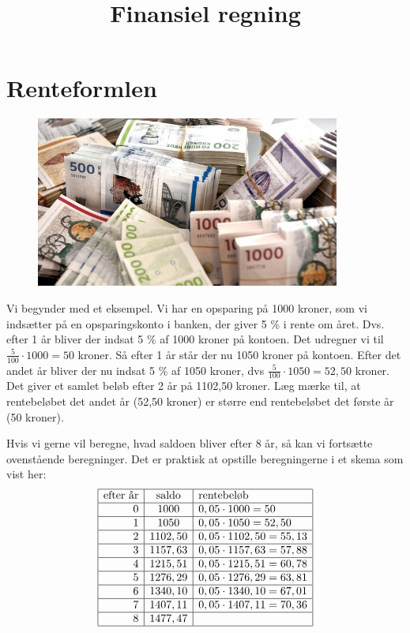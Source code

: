 \documentclass[12pt,oneside,a4paper]{article}
\title{Finansiel regning}
\date{\vspace{-5ex}}
\begin{document}
\maketitle


\section{Renteformlen}
\begin{figure}[ht]
    \centering
    \includegraphics[width=10cm]{penge}
\end{figure}

Vi begynder med et eksempel. Vi har en opsparing på 1000 kroner, som vi
indsætter på en opsparingskonto i banken, der giver 5 \% i rente om året. Dvs.
efter 1 år bliver der indsat 5 \% af 1000 kroner på kontoen. Det
udregner vi til $ \frac{5}{100} \cdot 1000 = 50 $ kroner. Så efter 1 år står
der nu 1050 kroner på kontoen.  Efter det andet år bliver der nu indsat 5 \% af
1050 kroner, dvs $ \frac{5}{100} \cdot 1050 = 52,50$ kroner.
Det giver et samlet beløb efter 2 år på 1102,50 kroner. Læg mærke til, at
rentebeløbet det andet år (52,50 kroner) er større end rentebeløbet det første
år (50 kroner).

Hvis vi gerne vil beregne, hvad saldoen bliver efter 8 år, så kan vi fortsætte
ovenstående beregninger. Det er praktisk at opstille beregningerne i et skema
som vist her:
\[
\begin{array}{|r|c|l|}
    \hline
    \mbox{efter år} & \mbox{saldo} & \mbox{rentebeløb} \\
    \hline
0 & 1000 & 0,05\cdot 1000 = 50 \\
    \hline
1 & 1050 & 0,05\cdot 1050 = 52,50 \\
    \hline
2 & 1102,50 & 0,05\cdot 1102,50 = 55,13 \\
    \hline
3 & 1157,63 & 0,05\cdot 1157,63 = 57,88 \\
    \hline
4 & 1215,51 & 0,05\cdot 1215,51 = 60,78 \\
    \hline
5 & 1276,29 & 0,05\cdot 1276,29 = 63,81 \\
    \hline
6 & 1340,10 & 0,05\cdot 1340,10 = 67,01 \\
    \hline
7 & 1407,11 & 0,05\cdot 1407,11 = 70,36 \\
    \hline
8 & 1477,47 & \\
\hline
\end{array}
\]
\end{document}
